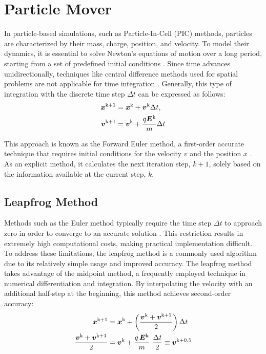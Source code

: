 \section{Particle Mover}
\label{Sec: Particle Motion}


In particle-based simulations, such as Particle-In-Cell (\acs{PIC}) methods, particles are characterized by their mass, charge, position, and velocity. To model their dynamics, it is essential to solve Newton's equations of motion over a long period, starting from a set of predefined initial conditions \cite{young_leapfrog_2013}. Since time advances unidirectionally, techniques like central difference methods used for spatial problems are not applicable for time integration \cite{brieda_plasma_2019}. Generally, this type of integration with the discrete time step $\Delta t$ can be expressed as follows:
 \begin{align}
\bm{x}^{\mathrm{k+1}} &= \bm{x}^{\mathrm{k}} + \bm{v}^{\mathrm{k}} \Delta t, \\
\bm{v}^{\mathrm{k+1}} &= \bm{v}^{\mathrm{k}} + \frac{q \bm{E}^{\mathrm{k}}}{m}  \Delta t
\end{align}

This approach is known as the Forward Euler method, a first-order accurate technique that requires initial conditions for the velocity $v$ and the position $x$ \cite{brieda_plasma_2019}. As an explicit method, it calculates the next iteration step, $k+1$, solely based on the information available at the current step, $k$.


\subsection{Leapfrog Method}
Methods such as the Euler method typically require the time step $\Delta t$ to approach zero in order to converge to an accurate solution \cite{brieda_plasma_2019}. This restriction results in extremely high computational costs, making practical implementation difficult. To address these limitations, the leapfrog method is a commonly used algorithm due to its relatively simple usage and improved accuracy. The leapfrog method takes advantage of the midpoint method, a frequently employed technique in numerical differentiation and integration. By interpolating the velocity with an additional half-step at the beginning, this method achieves second-order accuracy:
\begin{align}
        \boldvec{x}^\mathrm{k+1} &= \boldvec{x}^\mathrm{k} + \left(\frac{\boldvec{v}^\mathrm{k} + \boldvec{v}^\mathrm{k+1}}{2}\right) \Delta t\\
        \frac{\boldvec{v}^\mathrm{k} + \boldvec{v}^\mathrm{k+1}}{2} &= \boldvec{v}^\mathrm{k} + \frac{q\,\boldvec{E}^\mathrm{k}}{ m}\ \frac{\Delta t}{2}\equiv \boldvec{v}^\mathrm{k+0.5}
\end{align}


